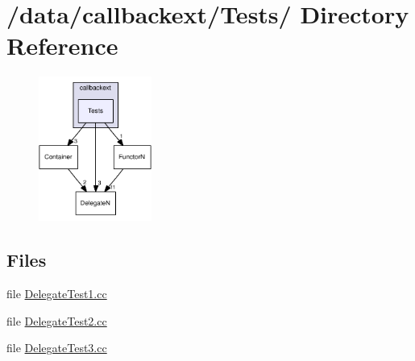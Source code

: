 \hypertarget{dir_000005}{
\section{/data/callbackext/Tests/ Directory Reference}
\label{dir_000005}
}


\begin{figure}[H]
\begin{center}
\leavevmode
\includegraphics[width=105pt]{dir_000005_dep}
\end{center}
\end{figure}
\subsection*{Files}
\begin{CompactItemize}
\item 
file \hyperlink{DelegateTest1_8cc}{Delegate\-Test1.cc}
\item 
file \hyperlink{DelegateTest2_8cc}{Delegate\-Test2.cc}
\item 
file \hyperlink{DelegateTest3_8cc}{Delegate\-Test3.cc}
\end{CompactItemize}
